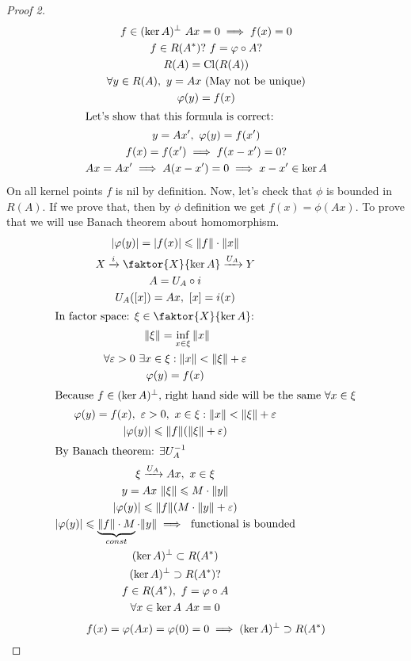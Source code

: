 \begin{proof}[Proof 2]
  \begin{gather*}
    f \in (\ker{A})^\perp\ Ax = 0 \implies f(x) = 0 \\
    f \in R(A^*) ?\ f = \phi \circ A ? \\
    R(A) = \cl{R(A)} \\
    \forall y \in R(A),\ y = Ax \text{ (May not be unique)} \\
    \phi(y) = f(x) \\
    \shortintertext{Let's show that this formula is correct:}
    y = A x',\ \phi(y) = f(x') \\
    f(x) = f(x') \implies f(x - x') = 0? \\
    Ax = Ax' \implies A(x - x') = 0 \implies x - x' \in \ker{A}
  \end{gather*}
  On all kernel points $f$ is nil by definition.
  Now, let's check that $\phi$ is bounded in $R(A)$. If we prove that, then
  by $\phi$ definition we get $f(x) = \phi(Ax)$. To prove that we will use
  Banach theorem about homomorphism.
  \begin{gather*}
    |\phi(y)| = |f(x)| \leq \|f\| \cdot \|x\| \\
    X \xrightarrow{i} \faktor{X}{\ker{A}} \xrightarrow{U_A} Y \\
    A = U_A \circ i \\
    U_A([x]) = Ax,\ [x] = i(x) \\
    \shortintertext{In factor space:  $\xi \in \faktor{X}{\ker{A}}$:} 
    \ \|\xi\| = \inf_{x \in \xi} \|x\| \\
    \forall \epsilon > 0\ \exists x \in \xi : \|x\| < \|\xi\| + \epsilon \\ 
    \phi(y) = f(x)\\
    \shortintertext{Because $f \in (\ker{A})^\perp$, right hand side will be
      the same $\forall x \in \xi$}
    \phi(y) = f(x),\ \epsilon > 0,\ x \in \xi : \|x\| < \|\xi\| + \epsilon \\
    |\phi(y)| \leq \|f\| (\|\xi\| + \epsilon) \\
    \shortintertext{By Banach theorem: $\exists U_A^{-1}$ }
    \xi \xrightarrow{U_A} Ax,\ x \in \xi \\
    y = Ax\ \|\xi\| \leq M \cdot \|y\| \\
    |\phi(y)| \leq \|f\| (M \cdot \|y\| + \epsilon) \\
    |\phi(y)| \leq \underbrace{\|f\| \cdot M}_{const} \cdot \|y\| \implies \text{
      functional is bounded} \\
    (\ker{A})^\perp \subset R(A^*) \\
    (\ker{A})^\perp \supset R(A^*) ?\\
    f \in R(A^*),\ f = \phi \circ A \\
    \forall x \in \ker{A}\ Ax = 0
  \end{gather*}
  \[   
    f(x) = \phi(Ax) = \phi(0) = 0 \implies (\ker{A})^\perp \supset R(A^*) \qedhere
  \]
\end{proof}